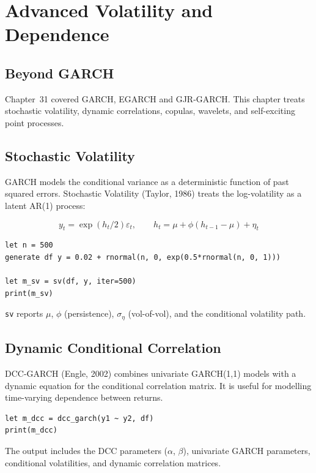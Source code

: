 \chapter{Advanced Volatility and Dependence}

\section{Beyond GARCH}

Chapter~31 covered GARCH, EGARCH and GJR-GARCH. This chapter treats
stochastic volatility, dynamic correlations, copulas, wavelets, and
self-exciting point processes.

\section{Stochastic Volatility}

GARCH models the conditional variance as a deterministic function of
past squared errors. Stochastic Volatility (Taylor, 1986) treats the
log-volatility as a latent AR(1) process:

\[
y_t = \exp(h_t/2) \varepsilon_t, \qquad
h_t = \mu + \phi(h_{t-1} - \mu) + \eta_t
\]

\begin{lstlisting}[caption={Stochastic Volatility}]
let n = 500
generate df y = 0.02 + rnormal(n, 0, exp(0.5*rnormal(n, 0, 1)))

let m_sv = sv(df, y, iter=500)
print(m_sv)
\end{lstlisting}

\texttt{sv} reports $\mu$, $\phi$ (persistence), $\sigma_\eta$ (vol-of-vol),
and the conditional volatility path.

\section{Dynamic Conditional Correlation}

DCC-GARCH (Engle, 2002) combines univariate GARCH(1,1) models with a
dynamic equation for the conditional correlation matrix. It is useful
for modelling time-varying dependence between returns.

\begin{lstlisting}[caption={DCC-GARCH}]
let m_dcc = dcc_garch(y1 ~ y2, df)
print(m_dcc)
\end{lstlisting}

The output includes the DCC parameters ($\alpha$, $\beta$), univariate
GARCH parameters, conditional volatilities, and dynamic correlation
matrices.

